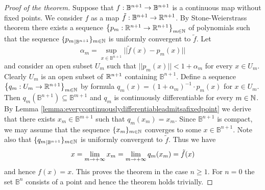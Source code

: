 \documentclass[10pt]{amsart}
\begin{document}
\begin{proof}[Proof of the theorem]
Suppose that $f:\mathbb{B}^{n+1}\rightarrow \mathbb{B}^{n+1}$ is a continuous map without fixed points. We consider $f$ as a map $\tilde{f}:\mathbb{B}^{n+1}\rightarrow {\mathbb R}^{n+1}$. By Stone-Weierstrass theorem there exists a sequence $\big\{p_m:{\mathbb R}^{n+1}\rightarrow {\mathbb R}^{n+1}\big\}_{m\in {\mathbb N}}$ of polynomials such that the sequence $\{{p_m}_{\mid \mathbb{B}^{n+1}}\}_{m\in {\mathbb N}}$ is uniformly convergent to $\tilde{f}$. Let
$$\alpha_m = \sup_{x\in \mathbb{B}^{n+1}}||\tilde{f}(x) - p_m(x)||$$
and consider an open subset $U_m$ such that $||p_m(x)|| < 1+\alpha_m$ for every $x\in U_m$. Clearly $U_m$ is an open subset of ${\mathbb R}^{n+1}$ containing $\mathbb{B}^{n+1}$. Define a sequence $\big\{q_m:U_m\rightarrow {\mathbb R}^{n+1}\big\}_{m\in {\mathbb N}}$ by formula $q_m(x) = (1 + \alpha_m)^{-1}\cdot p_m(x)$ for $x\in U_m$. Then $q_m(\mathbb{B}^{n+1}) \subseteq \mathbb{B}^{m+1}$ and $q_m$ is continuously differentiable for every $m\in {\mathbb N}$. By Lemma \ref{lemma:everycontinuouslydifferentiableadmitsafixedpoint} we derive that there exists $x_m \in \mathbb{B}^{m+1}$ such that $q_m(x_m) = x_m$. Since $\mathbb{B}^{n+1}$ is compact, we may assume that the sequence $\{x_m\}_{m\in {\mathbb N}}$ converges to some $x\in \mathbb{B}^{n+1}$. Note also that $\{{q_m}_{\mid \mathbb{B}^{n+1}}\}_{m\in {\mathbb N}}$ is uniformly convergent to $\tilde{f}$. Thus we have
$$x = \lim_{m\rightarrow +\infty}x_m = \lim_{m\rightarrow +\infty}q_m(x_m) = \tilde{f}(x)$$
and hence $f(x) = x$. This proves the theorem in the case $n\geq 1$. For $n=0$ the set $\mathbb{B}^n$ consists of a point and hence the theorem holds trivially.
\end{proof}

































\small


\end{document}

